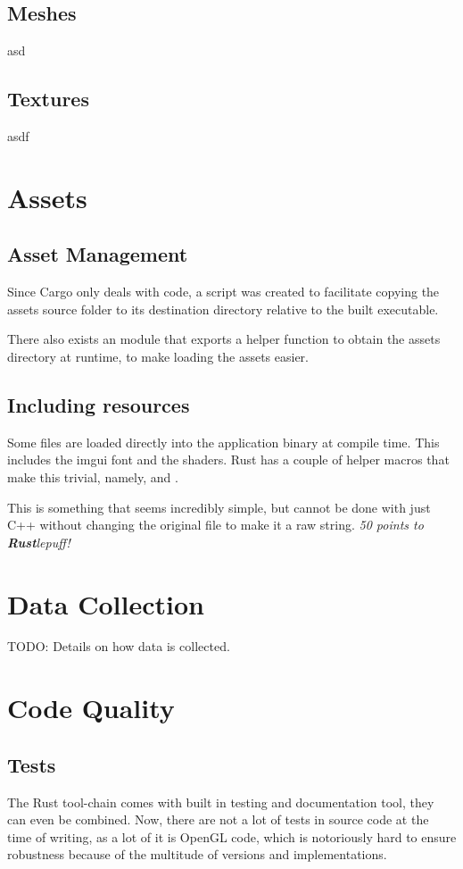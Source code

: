 \begin{multicols}{2}
  \subsection{Meshes}
  asd

  \subsection{Textures}
  asdf

  \section{Assets}

  \subsection{Asset Management}
  Since Cargo only deals with code, a  script was created to facilitate copying the assets source folder to its destination directory relative to the built executable.

  There also exists an  module that exports a helper function  to obtain the assets directory at runtime, to make loading the assets easier.

  \subsection{Including resources}
  Some files are loaded directly into the application binary at compile time.
  This includes the imgui font and the shaders.
  Rust has a couple of helper macros that make this trivial, namely,  and .

  This is something that seems incredibly simple, but cannot be done with just C++ without changing the original file to make it a raw string.
  \emph{50 points to \textbf{Rust}lepuff!}

  \section{Data Collection}

  TODO: Details on how data is collected.

  \section{Code Quality}

  \subsection{Tests}
  The Rust tool-chain comes with built in testing and documentation tool, they can even be combined.
  Now, there are not a lot of tests in source code at the time of writing, as a lot of it is OpenGL code, which is notoriously hard to ensure robustness because of the multitude of versions and implementations.


\end{multicols}
